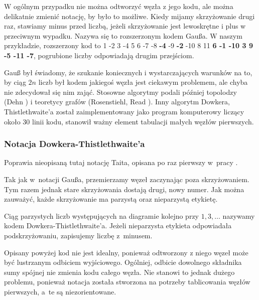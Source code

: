 W ogólnym przypadku nie można odtworzyć węzła z jego kodu, ale można delikatnie zmienić notację, by było to możliwe.
Kiedy mijamy skrzyżowanie drugi raz, stawiamy minus przed liczbą, jeżeli skrzyżowanie jest lewoskrętne i plus w przeciwnym wypadku.
Nazywa się to rozszerzonym kodem Gaußa.
W naszym przykładzie, rozszerzony kod to 1 -2 3 -4 5 6 -7 -8 \textbf{-4} -9 \textbf{-2} -10 8 11 \textbf{6 -1 -10 3 9 -5 -11 -7}, pogrubione liczby odpowiadają drugim przejściom.

Gauß był świadomy, że szukanie koniecznych i wystarczających warunków na to, by ciąg $2n$ liczb był kodem jakiegoś węzła jest ciekawym problemem, ale chyba nie zdecydował się nim zająć.
Stosowne algorytmy podali później topolodzy (Dehn \cite{dehn1936}) i teoretycy grafów (Rosenstiehl, Read \cite{rosenstiehl1978}).
Inny algorytm Dowkera, Thistlethwaite'a \cite{dowker1983} został zaimplementowany jako program komputerowy liczący około 30 linii kodu, stanowił ważny element tabulacji małych węzłów pierwszych.

%

\subsubsection{Notacja Dowkera-Thistlethwaite'a}
Poprawia nieopisaną tutaj notację Taita, opisana po raz pierwszy w~pracy \cite{dowker1983}.
%
%

Tak jak w~notacji Gaußa, przemierzamy węzeł zaczynając poza skrzyżowaniem.
Tym razem jednak stare skrzyżowania dostają drugi, nowy numer.
Jak można zauważyć, każde skrzyżowanie ma parzystą oraz nieparzystą etykietę.

\begin{definition}
    Ciąg parzystych liczb występujących na diagramie kolejno przy $1, 3, \ldots$ nazywamy kodem Dowkera-Thistlethwaite'a.
    Jeżeli nieparzysta etykieta odpowiadała podskrzyżowaniu, zapisujemy liczbę z~minusem.
\end{definition}

Opisany powyżej kod nie jest idealny, ponieważ odtworzony z niego węzeł może być lustrzanym odbiciem wyjściowego.
Ogólniej, odbicie dowolnego składnika sumy spójnej nie zmienia kodu całego węzła.
Nie stanowi to jednak dużego problemu, ponieważ notacja została stworzona na potrzeby tablicowania węzłów pierwszych, a~te są niezorientowane.

